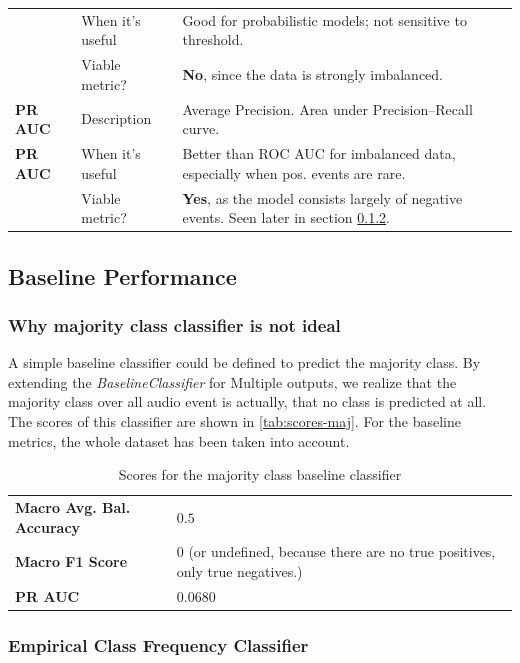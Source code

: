 \documentclass{article}
\begin{document}
\begin{xltabular}{\linewidth}{llX}
& When it's useful & Good for probabilistic models; not sensitive to threshold. \\
& Viable metric?   & \textbf{No}, since the data is strongly imbalanced. \\
\midrule
\textbf{PR AUC}
& Description      & Average Precision. Area under Precision–Recall curve. \\
\textbf{PR AUC}
& When it's useful & Better than ROC AUC for imbalanced data, especially when pos. events are rare. \\
& Viable metric?   & \textbf{Yes}, as the model consists largely of negative events. Seen later in section \ref{sec:empirical}. \\

\end{xltabular}

\subsection{Baseline Performance}

\subsubsection{Why majority class classifier is not ideal}

A simple baseline classifier could be defined to predict the majority class. By extending the \emph{BaselineClassifier} for Multiple outputs, we realize that the majority class over all audio event is actually, that no class is predicted at all. The scores of this classifier are shown in \autoref{tab:scores-maj}. For the baseline metrics, the whole dataset has been taken into account.


\begin{table}[hb]
\centering
\caption{Scores for the majority class baseline classifier} \label{tab:scores-maj}
\begin{tabularx}{\textwidth}{lX}
    \toprule
    \textbf{Macro Avg. Bal. Accuracy} & $0.5$ \\
    \textbf{Macro F1 Score} & $0$ (or undefined, because there are no true positives, only true negatives.) \\
    \textbf{PR AUC} & $0.0680$
\end{tabularx}
\end{table}

\subsubsection{Empirical Class Frequency Classifier}\label{sec:empirical}
\end{document}
